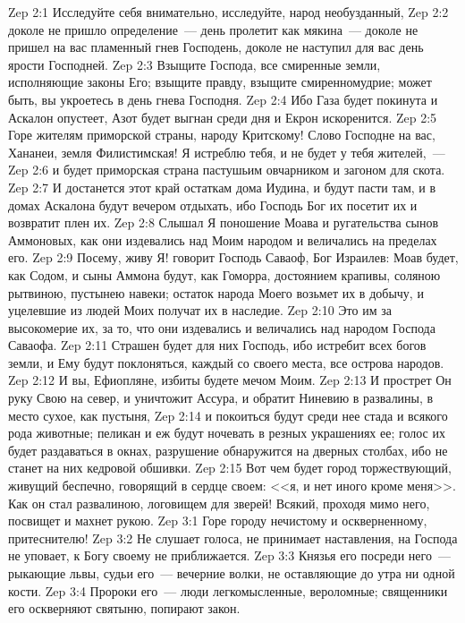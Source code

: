 \vs Zep 2:1 Исследуйте себя внимательно, исследуйте, народ необузданный,
\vs Zep 2:2 доколе не пришло определение~--- день пролетит как мякина~--- доколе не пришел на вас пламенный гнев Господень, доколе не наступил для вас день ярости Господней.
\vs Zep 2:3 Взыщите Господа, все смиренные земли, исполняющие законы Его; взыщите правду, взыщите смиренномудрие; может быть, вы укроетесь в день гнева Господня.
\vs Zep 2:4 Ибо Газа будет покинута и Аскалон опустеет, Азот будет выгнан среди дня и Екрон искоренится.
\rsbpar\vs Zep 2:5 Горе жителям приморской страны, народу Критскому! Слово Господне на вас, Хананеи, земля Филистимская! Я истреблю тебя, и не будет у тебя жителей,~---
\vs Zep 2:6 и будет приморская страна пастушьим овчарником и загоном для скота.
\vs Zep 2:7 И достанется этот край остаткам дома Иудина, и будут пасти там, и в домах Аскалона будут вечером отдыхать, ибо Господь Бог их посетит их и возвратит плен их.
\vs Zep 2:8 Слышал Я поношение Моава и ругательства сынов Аммоновых, как они издевались над Моим народом и величались на пределах его.
\vs Zep 2:9 Посему, живу Я! говорит Господь Саваоф, Бог Израилев: Моав будет, как Содом, и сыны Аммона будут, как Гоморра, достоянием крапивы, соляною рытвиною, пустынею навеки; остаток народа Моего возьмет их в добычу, и уцелевшие из людей Моих получат их в наследие.
\vs Zep 2:10 Это им за высокомерие их, за то, что они издевались и величались над народом Господа Саваофа.
\vs Zep 2:11 Страшен будет для них Господь, ибо истребит всех богов земли, и Ему будут поклоняться, каждый со своего места, все острова народов.
\vs Zep 2:12 И вы, Ефиопляне, избиты будете мечом Моим.
\vs Zep 2:13 И прострет Он руку Свою на север, и уничтожит Ассура, и обратит Ниневию в развалины, в место сухое, как пустыня,
\vs Zep 2:14 и покоиться будут среди нее стада и всякого рода животные; пеликан и еж будут ночевать в резных украшениях ее; голос их будет раздаваться в окнах, разрушение обнаружится на дверных столбах, ибо не станет на них кедровой обшивки.
\vs Zep 2:15 Вот чем будет город торжествующий, живущий беспечно, говорящий в сердце своем: <<я, и нет иного кроме меня>>. Как он стал развалиною, логовищем для зверей! Всякий, проходя мимо него, посвищет и махнет рукою.
\vs Zep 3:1 Горе городу нечистому и оскверненному, притеснителю!
\vs Zep 3:2 Не слушает голоса, не принимает наставления, на Господа не уповает, к Богу своему не приближается.
\vs Zep 3:3 Князья его посреди него~--- рыкающие львы, судьи его~--- вечерние волки, не оставляющие до утра ни одной кости.
\vs Zep 3:4 Пророки его~--- люди легкомысленные, вероломные; священники его оскверняют святыню, попирают закон.
